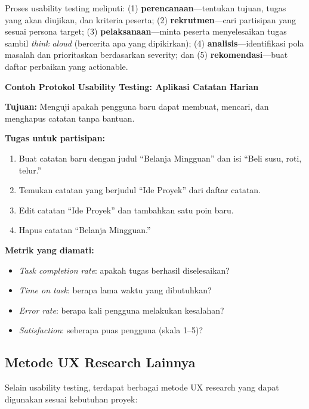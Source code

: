 Proses usability testing meliputi: (1) \textbf{perencanaan}---tentukan tujuan, tugas yang akan diujikan, dan kriteria peserta; (2) \textbf{rekrutmen}---cari partisipan yang sesuai persona target; (3) \textbf{pelaksanaan}---minta peserta menyelesaikan tugas sambil \textit{think aloud} (bercerita apa yang dipikirkan); (4) \textbf{analisis}---identifikasi pola masalah dan prioritaskan berdasarkan severity; dan (5) \textbf{rekomendasi}---buat daftar perbaikan yang actionable.

\begin{contoh}
\textbf{Contoh Protokol Usability Testing: Aplikasi Catatan Harian}

\textbf{Tujuan:} Menguji apakah pengguna baru dapat membuat, mencari, dan menghapus catatan tanpa bantuan.

\textbf{Tugas untuk partisipan:}
\begin{enumerate}
  \item Buat catatan baru dengan judul ``Belanja Mingguan'' dan isi ``Beli susu, roti, telur.''
  \item Temukan catatan yang berjudul ``Ide Proyek'' dari daftar catatan.
  \item Edit catatan ``Ide Proyek'' dan tambahkan satu poin baru.
  \item Hapus catatan ``Belanja Mingguan.''
\end{enumerate}

\textbf{Metrik yang diamati:}
\begin{itemize}
  \item \textit{Task completion rate}: apakah tugas berhasil diselesaikan?
  \item \textit{Time on task}: berapa lama waktu yang dibutuhkan?
  \item \textit{Error rate}: berapa kali pengguna melakukan kesalahan?
  \item \textit{Satisfaction}: seberapa puas pengguna (skala 1--5)?
\end{itemize}
\end{contoh}

\subsection{Metode UX Research Lainnya}

Selain usability testing, terdapat berbagai metode UX research yang dapat digunakan sesuai kebutuhan proyek:

